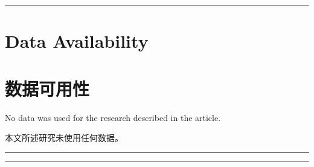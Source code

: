 \documentclass[12pt,a4paper]{article}
\newenvironment{original}
  {\par\medskip\noindent\color{black}\ignorespaces}
  {\par\medskip}
\newenvironment{translation}
  {\par\noindent\color{darkblue}\ignorespaces}
  {\par\medskip\noindent\hrule\par\medskip}
\theoremstyle{definition}
\theoremstyle{remark}
\begin{document}
\bigskip
\noindent\rule{\textwidth}{0.4pt}
\bigskip

\section*{Data Availability}
\section*{\color{darkblue}数据可用性}

\begin{original}
No data was used for the research described in the article.
\end{original}
\begin{translation}
本文所述研究未使用任何数据。
\end{translation}

\bigskip
\noindent\rule{\textwidth}{0.4pt}
\bigskip
\end{document}
